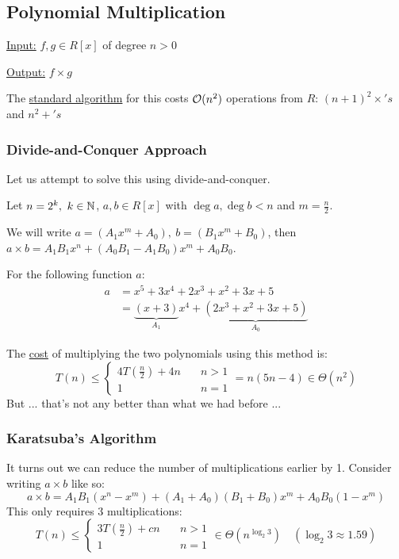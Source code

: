 \subsection{Polynomial Multiplication}
\underline{Input:} $f,g \in R[x]$ of degree $n > 0$

\underline{Output:} $f \times g$

The \underline{standard algorithm} for this costs $\operatorname{\mathcal{O}}(n^2)$ operations from $R$: $(n + 1)^2 \times's$ and $n^2 +'s$

\subsubsection{Divide-and-Conquer Approach}
Let us attempt to solve this using divide-and-conquer.

Let $n = 2^k, \ k \in \operatorname{\mathbb{N}}$, $a,b \in R[x]$ with $\deg a, \deg b < n$ and $m = \frac{n}{2}$.

We will write $a = (A_1x^m + A_0), \ b = (B_1x^m + B_0)$, then $a \times b = A_1B_1x^n + (A_0B_1 - A_1B_0)x^m + A_0B_0$.

\begin{example}{}{}
    For the following function $a$:
    \begin{align*}
        a &= x^5 + 3x^4 + 2x^3 + x^2 + 3x + 5 \\
        &= \underbrace{(x+3)}_{A_1}x^4 + 
        \underbrace{(2x^3 + x^2 + 3x + 5)}_{A_0}
    \end{align*}
\end{example}

The \underline{cost} of multiplying the two polynomials using this method is:
\begin{equation}
    T(n) \leq
    \begin{cases}
        4T\left(\frac{n}{2}\right) + 4n \quad & n > 1 \\
        1 \quad & n = 1
    \end{cases}
    = n(5n - 4) \in \Theta(n^2)
\end{equation}
But ... that's not any better than what we had before ...

\subsubsection{Karatsuba's Algorithm}
It turns out we can reduce the number of multiplications earlier by 1.
Consider writing $a \times b$ like so:
\begin{equation}
    a \times b = A_1B_1(x^n - x^m) + (A_1 + A_0)(B_1 + B_0)x^m + A_0B_0(1 - x^m)
\end{equation}
This only requires $3$ multiplications:
\begin{equation}
    T(n) \leq
    \begin{cases}
        3T\left(\frac{n}{2}\right) + cn \quad & n > 1 \\
        1 \quad & n = 1
    \end{cases}
    \in \Theta(n^{\log_2 3}) \quad (\log_2 3 \approx 1.59)
\end{equation}


